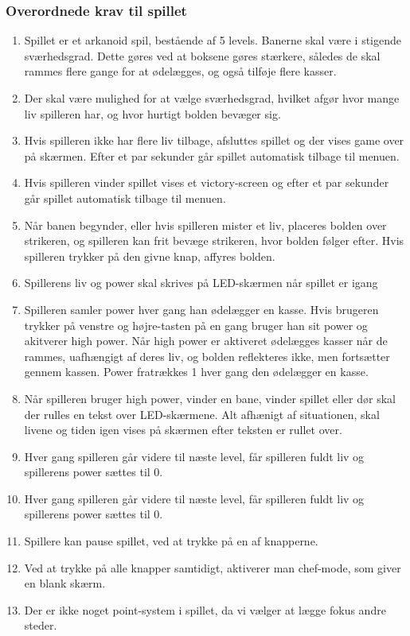 \subsubsection{Overordnede krav til spillet}
\begin{enumerate}
\item Spillet er et arkanoid spil, bestående af 5 levels. Banerne skal være i stigende sværhedsgrad. Dette gøres ved at boksene gøres stærkere, således de skal rammes flere gange for at ødelægges, og også tilføje flere kasser.
\item Der skal være mulighed for at vælge sværhedsgrad, hvilket afgør hvor mange liv spilleren har, og hvor hurtigt bolden bevæger sig.
\item Hvis spilleren ikke har flere liv tilbage, afsluttes spillet og der vises game over på skærmen. Efter et par sekunder går spillet automatisk tilbage  til menuen.
\item Hvis spilleren vinder spillet vises et victory-screen og efter et par sekunder går spillet automatisk tilbage til menuen.
\item Når banen begynder, eller hvis spilleren mister et liv, placeres bolden over strikeren, og spilleren kan frit bevæge strikeren, hvor bolden følger efter. Hvis spilleren trykker på den givne knap, affyres bolden.
\item Spillerens liv og power skal skrives på LED-skærmen når spillet er igang
\item Spilleren samler power hver gang han ødelægger en kasse. Hvis brugeren trykker på venstre og højre-tasten på en gang bruger han sit power og akitverer high power. Når high power er aktiveret ødelægges kasser når de rammes, uafhængigt af deres liv, og bolden reflekteres ikke, men fortsætter gennem kassen. Power fratrækkes 1 hver gang den ødelægger en kasse.
\item Når spilleren bruger high power, vinder en bane, vinder spillet eller dør skal der rulles en tekst over LED-skærmene. Alt afhænigt af situationen, skal livene og tiden igen vises på skærmen efter teksten er rullet over.
\item Hver gang spilleren går videre til næste level, får spilleren fuldt liv og spillerens power sættes til 0.
\item Hver gang spilleren går videre til næste level, får spilleren fuldt liv og spillerens power sættes til 0.
\item Spillere kan pause spillet, ved at trykke på en af knapperne.
\item Ved at trykke på alle knapper samtidigt, aktiverer man chef-mode, som giver en blank skærm.  
\item Der er ikke noget point-system i spillet, da vi vælger at lægge fokus andre steder.
\end{enumerate}
